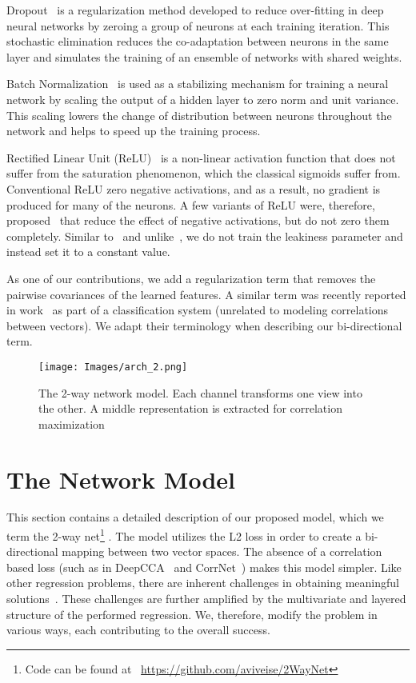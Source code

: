 \documentclass[10pt,twocolumn,letterpaper]{article}
\begin{document}
Dropout~\cite{dropout} is a regularization method developed to reduce over-fitting in deep neural networks by zeroing a group of neurons at each training iteration. This stochastic elimination reduces the co-adaptation between neurons in the same layer and simulates the training of an ensemble of networks with shared weights. 

Batch Normalization~\cite{bn} is used as a stabilizing   
mechanism for training a neural network by scaling the output of a hidden layer to zero norm and unit variance. This scaling lowers the change of distribution between neurons throughout the network and helps to speed up the training process. 

Rectified Linear Unit (ReLU)~\cite{relu} is a non-linear activation function that does not suffer from the saturation phenomenon, which the classical sigmoids suffer from. Conventional ReLU zero negative activations, and as a result, no gradient is produced for many of the neurons. A few variants of ReLU were, therefore, proposed~\cite{relu2,relu3} that reduce the effect of negative activations, but do not zero them completely. Similar to~\cite{relu2} and unlike~\cite{relu3}, we do not train the leakiness parameter and instead set it to a constant value.

As one of our contributions, we add a regularization term that removes the pairwise covariances of the learned features. A similar term was recently reported in work~\cite{DBLP:journals/corr/CogswellAGZB15} as part of a classification system (unrelated to modeling correlations between vectors). We adapt their terminology when describing our bi-directional term. 

\begin{figure}[t]
\centering
\texttt{[image: Images/arch\_2.png]}
\caption{The 2-way network model. Each channel transforms one view into the other. A middle representation is extracted for correlation maximization}
\label{fig:arch}
\end{figure}

\section{The Network Model}
\label{sec:arch}
This section contains a detailed description of our proposed model, which we term the 2-way net\footnote{Code can be found at ~\url{https://github.com/aviveise/2WayNet}}
. The model utilizes the L2 loss in order to create a bi-directional mapping between two vector spaces. The absence of a correlation based loss (such as in DeepCCA~\cite{deepcca} and CorrNet~\cite{chandar2016correlational}) makes this model simpler. Like other regression problems, there are inherent challenges in obtaining meaningful solutions~\cite{neural-networks-2}. These challenges are further amplified by the multivariate and layered structure of the performed regression. We, therefore, modify the problem in various ways, each contributing to the overall success.
\end{document}
